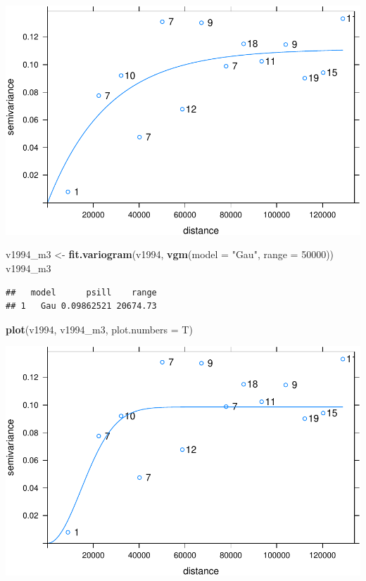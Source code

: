 \documentclass[11pt,]{article}
\newenvironment{Shaded}{\begin{snugshade}}{\end{snugshade}}
\newcommand{\KeywordTok}[1]{\textcolor[rgb]{0.13,0.29,0.53}{\textbf{#1}}}
\newcommand{\DataTypeTok}[1]{\textcolor[rgb]{0.13,0.29,0.53}{#1}}
\newcommand{\DecValTok}[1]{\textcolor[rgb]{0.00,0.00,0.81}{#1}}
\newcommand{\StringTok}[1]{\textcolor[rgb]{0.31,0.60,0.02}{#1}}
\newcommand{\NormalTok}[1]{#1}
\begin{document}
\includegraphics{proyecto_files/figure-latex/unnamed-chunk-4-7.pdf}

\begin{Shaded}
\begin{Highlighting}[]
\NormalTok{v1994_m3 <-}\StringTok{ }\KeywordTok{fit.variogram}\NormalTok{(v1994, }\KeywordTok{vgm}\NormalTok{(}\DataTypeTok{model =} \StringTok{"Gau"}\NormalTok{, }\DataTypeTok{range =} \DecValTok{50000}\NormalTok{))}
\NormalTok{v1994_m3}
\end{Highlighting}
\end{Shaded}

\begin{verbatim}
##   model      psill    range
## 1   Gau 0.09862521 20674.73
\end{verbatim}

\begin{Shaded}
\begin{Highlighting}[]
\KeywordTok{plot}\NormalTok{(v1994, v1994_m3, }\DataTypeTok{plot.numbers =}\NormalTok{ T)}
\end{Highlighting}
\end{Shaded}

\includegraphics{proyecto_files/figure-latex/unnamed-chunk-4-8.pdf}
\end{document}
